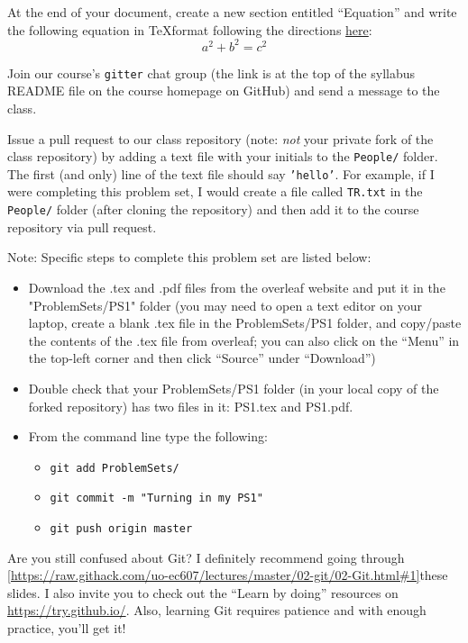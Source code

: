 \documentclass[12pt,english]{exam}
\begin{document}
\begin{questions}
\question At the end of your document, create a new section entitled ``Equation'' and write the following equation in \TeX format following the directions \href{https://www.overleaf.com/learn/latex/mathematical_expressions}{here}:
\begin{equation}
	a^{2} + b^{2} = c^{2}
\end{equation}

\question Join our course's \texttt{gitter} chat group (the link is at the top of the syllabus README file on the course homepage on GitHub) and send a message to the class.

\question Issue a pull request to our class repository (note: \emph{not} your private fork of the class repository) by adding a text file with your initials to the \texttt{People/} folder. The first (and only) line of the text file should say \texttt{'hello'}. For example, if I were completing this problem set, I would create a file called \texttt{TR.txt} in the \texttt{People/} folder (after cloning the repository) and then add it to the course repository via pull request.

\end{questions}

Note: Specific steps to complete this problem set are listed below:
\begin{itemize}
\item Download the .tex and .pdf files from the overleaf website and put it in the "ProblemSets/PS1" folder (you may need to open a text editor on your laptop, create a blank .tex file in the ProblemSets/PS1 folder, and copy/paste the contents of the .tex file from overleaf; you can also click on the ``Menu'' in the top-left corner and then click ``Source'' under ``Download'')
\item Double check that your ProblemSets/PS1 folder (in your local copy of the forked repository) has two files in it: PS1.tex and PS1.pdf.
\item From the command line type the following:
    \begin{itemize}
    \item \texttt{git add ProblemSets/}
    \item \texttt{git commit -m "Turning in my PS1"}
    \item \texttt{git push origin master}
    \end{itemize}
\end{itemize}

Are you still confused about Git? I definitely recommend going through \ref{https://raw.githack.com/uo-ec607/lectures/master/02-git/02-Git.html#1}{these slides}. I also invite you to check out the ``Learn by doing'' resources on \url{https://try.github.io/}. Also, learning Git requires patience and with enough practice, you'll get it!
\end{document}
